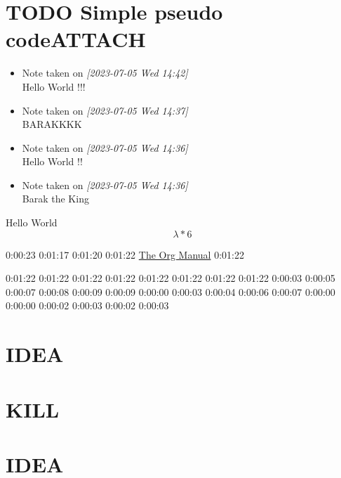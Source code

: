 \documentclass[9pt,twocolumn]{article}
\theoremstyle{definition}
\begin{document}
\section*{{\bfseries\sffamily TODO} Simple pseudo code\hfill{}\textsc{ATTACH}}
\label{sec:orgd8d4fe5}
\begin{itemize}
\item Note taken on \textit{[2023-07-05 Wed 14:42] } \\[0pt]
Hello World !!!
\item Note taken on \textit{[2023-07-05 Wed 14:37] } \\[0pt]
BARAKKKK
\item Note taken on \textit{[2023-07-05 Wed 14:36] } \\[0pt]
Hello World !!
\item Note taken on \textit{[2023-07-05 Wed 14:36] } \\[0pt]
Barak the King
\end{itemize}
Hello World
\begin{displaymath}
\lambda *6
\end{displaymath}

0:00:23
0:01:17
0:01:20
0:01:22
\href{https://orgmode.org/org.html\#Tables-in-LaTeX-export}{The Org Manual}
0:01:22

0:01:22
0:01:22
0:01:22
0:01:22 0:01:22 0:01:22 0:01:22 0:01:22
0:00:03 0:00:05 0:00:07 0:00:08 0:00:09 0:00:09 0:00:00 0:00:03 0:00:04
0:00:06 0:00:07 0:00:00 0:00:00 0:00:02 0:00:03 0:00:02 0:00:03
\section*{{\bfseries\sffamily IDEA} }
\label{sec:orgf389a63}
\section*{{\bfseries\sffamily KILL} }
\label{sec:org609a9d6}
\section*{{\bfseries\sffamily IDEA} }
\label{sec:org8875032}
\end{document}

